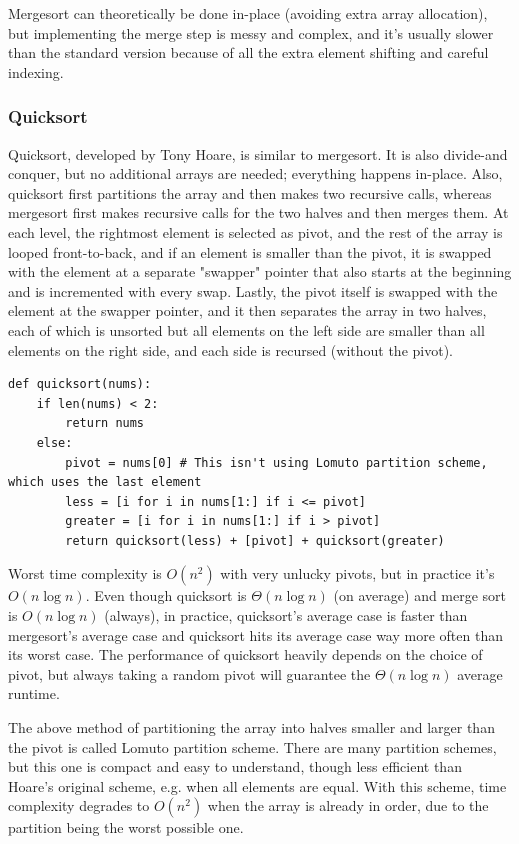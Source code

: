 \documentclass[table, xcdraw]{article}%
\begin{document}
Mergesort can theoretically be done in-place (avoiding extra array allocation), but implementing the merge step is messy and complex, and it's usually slower than the standard version because of all the extra element shifting and careful indexing.

\subsubsection{Quicksort} \label{quicksort}

Quicksort, developed by Tony Hoare, is similar to mergesort. It is also divide-and conquer, but no additional arrays are needed; everything happens in-place. Also, quicksort first partitions the array and then makes two recursive calls, whereas mergesort first makes recursive calls for the two halves and then merges them. At each level, the rightmost element is selected as pivot, and the rest of the array is looped front-to-back, and if an element is smaller than the pivot, it is swapped with the element at a separate "swapper" pointer that also starts at the beginning and is incremented with every swap. Lastly, the pivot itself is swapped with the element at the swapper pointer, and it then separates the array in two halves, each of which is unsorted but all elements on the left side are smaller than all elements on the right side, and each side is recursed (without the pivot).

\begin{verbatim}
def quicksort(nums):
    if len(nums) < 2:
        return nums
    else:
        pivot = nums[0] # This isn't using Lomuto partition scheme, which uses the last element
        less = [i for i in nums[1:] if i <= pivot]
        greater = [i for i in nums[1:] if i > pivot]
        return quicksort(less) + [pivot] + quicksort(greater)
\end{verbatim}

Worst time complexity is $O(n^2)$ with very unlucky pivots, but in practice it's $O(n \log n)$. Even though quicksort is $\Theta(n \log n)$ (on average) and merge sort is $O(n \log n)$ (always), in practice, quicksort's average case is faster than mergesort's average case and quicksort hits its average case way more often than its worst case. The performance of quicksort heavily depends on the choice of pivot, but always taking a random pivot will guarantee the $\Theta(n \log n)$ average runtime.

The above method of partitioning the array into halves smaller and larger than the pivot is called Lomuto partition scheme. There are many partition schemes, but this one is compact and easy to understand, though less efficient than Hoare's original scheme, e.g. when all elements are equal. With this scheme, time complexity degrades to $O(n^2)$ when the array is already in order, due to the partition being the worst possible one.
\end{document}
